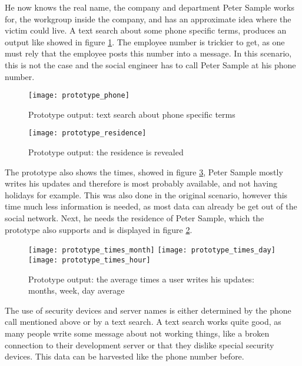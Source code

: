 He now knows the real name, the
company and department Peter Sample works for, the workgroup inside the
company, and has an approximate idea where the victim could live. A text search
about some phone specific terms, produces an output like showed in figure
\ref{fig:prototype_phone}. The employee number is trickier to get, as one must
rely that the employee posts this number into a message. In this scenario, this
is not the case and the social engineer has to call Peter Sample at his phone
number.

\begin{figure}[htb]
  \begin{center}
    \texttt{[image: prototype\_phone]}
    \caption{Prototype output: text search about phone specific terms}
    \label{fig:prototype_phone}
  \end{center}
\end{figure}


\begin{figure}[htb]
  \begin{center}
    \texttt{[image: prototype\_residence]}
    \caption{Prototype output: the residence is revealed}
    \label{fig:prototype_residence}
  \end{center}
\end{figure}
The prototype also shows the times, showed in figure
\ref{fig:prototype_times}, Peter Sample mostly writes his
updates and therefore is most probably available, and not having holidays for
example. This was also done in the original scenario, however this time much
less information is needed, as most data can already be get out of the social
network. Next, he needs the residence of Peter Sample, which the prototype also
supports and is displayed in figure \ref{fig:prototype_residence}.

\begin{figure}[htb]
  \begin{center}
    \texttt{[image: prototype\_times\_month]} 
    \texttt{[image: prototype\_times\_day]} 
    \texttt{[image: prototype\_times\_hour]}
    \caption{Prototype output: the average times a user writes his updates: months,
    week, day average}
    \label{fig:prototype_times}
  \end{center}
\end{figure}

The use of security devices and server names is either determined by the phone
call mentioned above or by a text search. A text search works quite good, as
many people write some message about not working things, like a broken
connection to their development server or that they dislike special security
devices. This data can be harvested like the phone number before.

